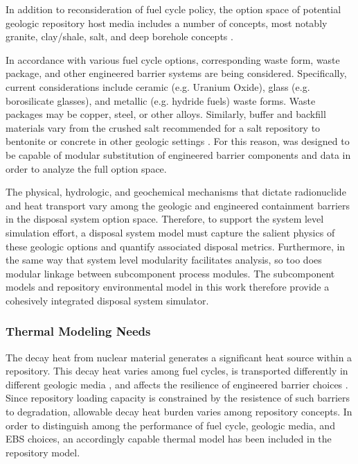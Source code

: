 

In addition to reconsideration of fuel cycle policy, the option space of 
potential geologic repository host media includes a number of concepts, most 
notably granite, clay/shale, salt, and deep borehole concepts 
\cite{nutt_used_2010, von_lensa_red-impact_2008}. 


In accordance with various fuel cycle options, corresponding waste form, waste 
package, and other engineered barrier systems are being considered.  
Specifically, current considerations include ceramic (e.g.  Uranium Oxide), 
glass (e.g.  borosilicate glasses), and metallic (e.g.  hydride fuels) waste 
forms. Waste packages may be copper, steel, or other alloys. Similarly, buffer 
and backfill materials vary from the crushed salt recommended for a salt 
repository \cite{hardin_generic_2011} to bentonite or concrete in other 
geologic settings \cite{andra_argile:_2005}. For this reason, \Cyder
was designed to be capable of modular substitution of engineered barrier 
components and data in order to analyze the full option space.


The physical, hydrologic, and geochemical mechanisms that dictate 
radionuclide and heat transport vary among the geologic and engineered 
containment barriers in the disposal system option space.  Therefore, 
to support the system level simulation effort, a disposal system model must
capture the salient physics of these geologic options and quantify associated 
disposal metrics.  Furthermore, in the same way that system level 
modularity facilitates analysis, so too does modular linkage between subcomponent 
process modules. The subcomponent models and repository environmental model in 
this work therefore provide a cohesively integrated disposal system simulator.


\subsubsection{Thermal Modeling Needs}
The decay heat from nuclear material generates a significant heat source within 
a repository. This decay heat varies among fuel cycles, is transported  
differently in different geologic media \cite{greenberg_application_2012}, and 
affects the resilience of engineered barrier choices \cite{andra_argile:_2005}. 
Since repository loading capacity is constrained by the resistence of such 
barriers to degradation, allowable decay heat burden varies among repository 
concepts. In order to distinguish among the performance of fuel 
cycle, geologic media, and \gls{EBS} choices, an accordingly capable thermal 
model has been included in the repository model. 

